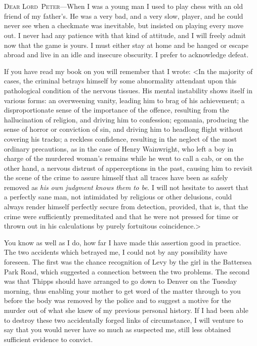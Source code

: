 \chapter[Chapter \thechapter]{}
\lettrine{D}{ear} \textsc{Lord~Peter}—When I was a young man I used to play chess with an old friend of my father's. He was a very bad, and a very slow, player, and he could never see when a checkmate was inevitable, but insisted on playing every move out. I never had any patience with that kind of attitude, and I will freely admit now that the game is yours. I must either stay at home and be hanged or escape abroad and live in an idle and insecure obscurity. I prefer to acknowledge defeat.

If you have read my book on  you will remember that I wrote: <In the majority of cases, the criminal betrays himself by some abnormality attendant upon this pathological condition of the nervous tissues. His mental instability shows itself in various forms: an overweening vanity, leading him to brag of his achievement; a disproportionate sense of the importance of the offence, resulting from the hallucination of religion, and driving him to confession; egomania, producing the sense of horror or conviction of sin, and driving him to headlong flight without covering his tracks; a reckless confidence, resulting in the neglect of the most ordinary precautions, as in the case of Henry Wainwright, who left a boy in charge of the murdered woman's remains while he went to call a cab, or on the other hand, a nervous distrust of apperceptions in the past, causing him to revisit the scene of the crime to assure himself that all traces have been as safely removed as \emph{his own judgment knows them to be}. I will not hesitate to assert that a perfectly sane man, not intimidated by religious or other delusions, could always render himself perfectly secure from detection, provided, that is, that the crime were sufficiently premeditated and that he were not pressed for time or thrown out in his calculations by purely fortuitous coincidence.>

You know as well as I do, how far I have made this assertion good in practice. The two accidents which betrayed me, I could not by any possibility have foreseen. The first was the chance recognition of Levy by the girl in the Battersea Park Road, which suggested a connection between the two problems. The second was that Thipps should have arranged to go down to Denver on the Tuesday morning, thus enabling your mother to get word of the matter through to you before the body was removed by the police and to suggest a motive for the murder out of what she knew of my previous personal history. If I had been able to destroy these two accidentally forged links of circumstance, I will venture to say that you would never have so much as suspected me, still less obtained sufficient evidence to convict.

